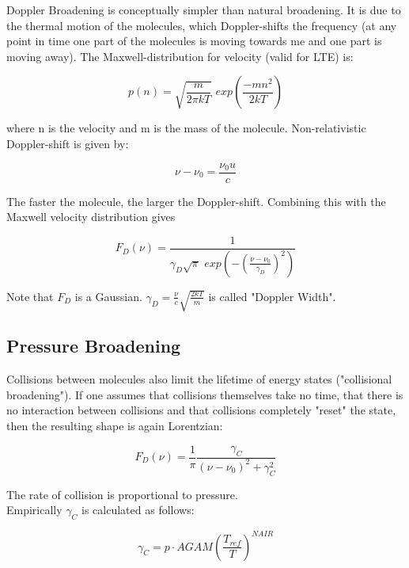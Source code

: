 \documentclass[a4paper,fleqn]{article}
\begin{document}
Doppler Broadening is conceptually simpler than natural broadening. It is due to the thermal motion of the molecules, which Doppler-shifts the frequency (at any point in time one part of the molecules is moving towards me and one part is moving away). The Maxwell-distribution for velocity (valid for LTE) is:

\begin{equation}
p(n) = \sqrt{\frac{m}{2\pi kT}} \,\, exp(\frac{-mn^{2}}{2kT})  
\end{equation}

where n is the velocity and m is the mass of the molecule. 
Non-relativistic Doppler-shift is given by:

\begin{equation}
\nu - \nu_{0} = \frac{\nu_{0}u}{c}
\end{equation}

The faster the molecule, the larger the Doppler-shift. Combining this with the Maxwell velocity distribution gives

\begin{equation}
F_{D}(\nu) = \frac{1}{\gamma_{D}\sqrt{\pi} \,\, exp(-(\frac{\nu - \nu_{0}}{\gamma_{D}})^{2})}
\end{equation}

Note that $F_{D}$ is a Gaussian. $\gamma_{D} = \frac{\nu}{c} \sqrt{\frac{2kT}{m}}$ is called "Doppler Width". 

\subsection{Pressure Broadening}

Collisions between molecules also limit the lifetime of energy states ("collisional broadening"). If one assumes that collisions themselves take no time, that there is no interaction between collisions and that collisions completely "reset" the state, then the resulting shape is again Lorentzian:

\begin{equation}
F_{D}(\nu) = \frac{1}{\pi} \frac{\gamma_{C}}{(\nu - \nu_{0})^{2} + \gamma_{C}^{2}} 
\end{equation}

The rate of collision is proportional to pressure. \\

Empirically $\gamma_{C}$ is calculated as follows:

\begin{equation}
\gamma_{C} = p \cdot AGAM (\frac{T_{ref}}{T})^{NAIR}
\end{equation}
\end{document}
